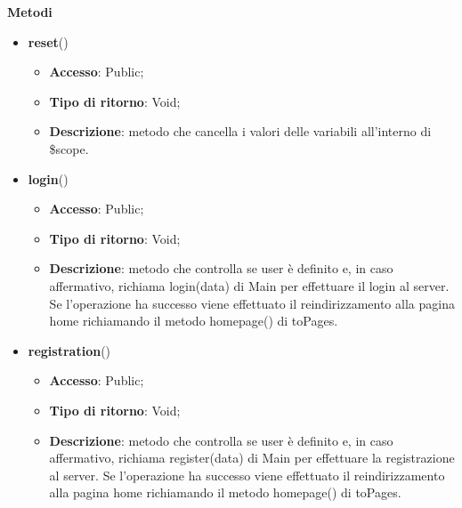 {{\begin{itemize}
\begin{itemize}
			\end{itemize}
	    \end{itemize}
		\textbf{Metodi}
		\begin{itemize}
			\item \textbf{reset}()
			\begin{itemize}
				\item \textbf{Accesso}: Public;
				\item \textbf{Tipo di ritorno}: Void;
				\item \textbf{Descrizione}: metodo che cancella i valori delle variabili all'interno di \$scope.
			\end{itemize}
			\item \textbf{login}()
			\begin{itemize}
				\item \textbf{Accesso}: Public;
				\item \textbf{Tipo di ritorno}: Void;
				\item \textbf{Descrizione}: metodo che controlla se user è definito e, in caso affermativo, richiama login(data) di Main per effettuare il login al server. Se l'operazione ha successo viene effettuato il reindirizzamento alla pagina home richiamando il metodo homepage() di toPages.
			\end{itemize}
	        \item \textbf{registration}()
			\begin{itemize}
				\item \textbf{Accesso}: Public;
				\item \textbf{Tipo di ritorno}: Void;
				\item \textbf{Descrizione}: metodo che controlla se user è definito e, in caso affermativo, richiama register(data) di Main per effettuare la registrazione al server. Se l'operazione ha successo viene effettuato il reindirizzamento alla pagina home richiamando il metodo homepage() di toPages.
			\end{itemize}
		\end{itemize}
	}
}
